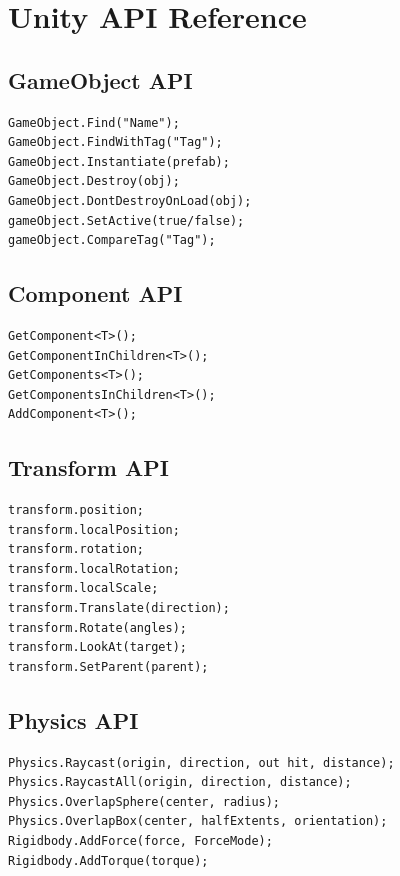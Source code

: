 
\chapter{Unity API Reference}

\section{GameObject API}

\begin{lstlisting}[language={[Sharp]C}]
GameObject.Find("Name");
GameObject.FindWithTag("Tag");
GameObject.Instantiate(prefab);
GameObject.Destroy(obj);
GameObject.DontDestroyOnLoad(obj);
gameObject.SetActive(true/false);
gameObject.CompareTag("Tag");
\end{lstlisting}

\section{Component API}

\begin{lstlisting}[language={[Sharp]C}]
GetComponent<T>();
GetComponentInChildren<T>();
GetComponents<T>();
GetComponentsInChildren<T>();
AddComponent<T>();
\end{lstlisting}

\section{Transform API}

\begin{lstlisting}[language={[Sharp]C}]
transform.position;
transform.localPosition;
transform.rotation;
transform.localRotation;
transform.localScale;
transform.Translate(direction);
transform.Rotate(angles);
transform.LookAt(target);
transform.SetParent(parent);
\end{lstlisting}

\section{Physics API}

\begin{lstlisting}[language={[Sharp]C}]
Physics.Raycast(origin, direction, out hit, distance);
Physics.RaycastAll(origin, direction, distance);
Physics.OverlapSphere(center, radius);
Physics.OverlapBox(center, halfExtents, orientation);
Rigidbody.AddForce(force, ForceMode);
Rigidbody.AddTorque(torque);
\end{lstlisting}

